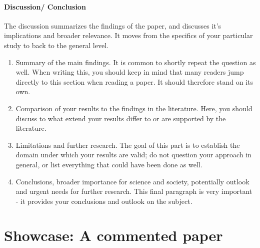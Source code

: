 \documentclass{tufte-book}
\begin{document}
\paragraph{Discussion/ Conclusion} The discussion summarizes the findings of the paper, and discusses it's implications and broader relevance. It moves from the specifics of your particular study to back to the general level. 

\begin{enumerate}
\item Summary of the main findings. It is common to shortly repeat the question as well. When writing this, you should keep in mind that many readers jump directly to this section when reading a paper. It should therefore stand on its own. 
\item Comparison of your results to the findings in the literature. Here, you should discuss to what extend your results differ to or are supported by the literature. 
\item Limitations and further research. The goal of this part is to establish the domain under which your results are valid; do not question your approach in general, or list everything that could have been done as well. 
\item Conclusions, broader importance for science and society, potentially outlook and urgent needs for further research. This final paragraph is very important - it provides your conclusions and outlook on the subject. 
\end{enumerate} 



\section{Showcase: A commented paper}
\end{document}
